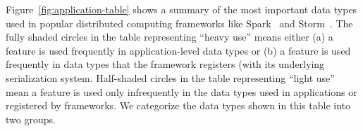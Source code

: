 \documentclass[10pt]{sigplanconf}
\theoremstyle{definition}
\theoremstyle{definition}
\begin{document}

Figure~\ref{fig:application-table} shows a summary of the most
important data types used in popular distributed computing frameworks
like Spark~\cite{Zaharia2012} and Storm~\cite{Storm}.
The fully shaded circles in the table representing ``heavy use'' means either
(a) a feature is used frequently in application-level data types or
(b) a feature is used frequently in data types that the framework registers
(with its underlying serialization system.
Half-shaded circles in the table representing ``light use'' mean a feature is used
only infrequently in the data types used in applications or registered by
frameworks. We categorize the data types shown in this table into two groups.
\end{document}

